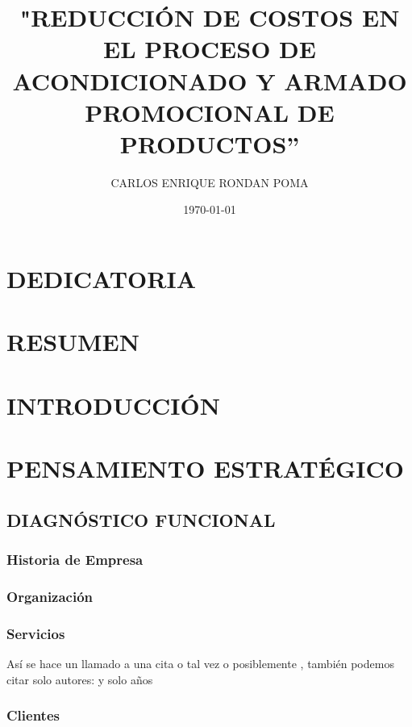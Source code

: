 \documentclass{report}
\title{"REDUCCIÓN DE COSTOS EN EL PROCESO DE ACONDICIONADO Y ARMADO PROMOCIONAL DE PRODUCTOS''}
\author{CARLOS ENRIQUE RONDAN POMA}
\date{\today}
\begin{document}


\newpage 

\fontsize{13pt}{15pt}\selectfont


\chapter*{DEDICATORIA}
\begin{flushright}
\lipsum[4]
\end{flushright}
\newpage


\tableofcontents
\newpage 

\chapter*{RESUMEN}
\lipsum[1-2]
\chapter*{INTRODUCCIÓN}
\lipsum[1-2]

\chapter{PENSAMIENTO ESTRATÉGICO}
\section{DIAGNÓSTICO FUNCIONAL}
\subsection{Historia de Empresa}
\lipsum[1-3]
\subsection{Organización}
\lipsum[5-9]
\subsection{Servicios}
\lipsum[1-3]
Así se hace un llamado a una cita  \cite{reddy2020predictive} o tal vez \citet{bansal2021performance} o posiblemente \citep{dhasaradhan2021hybrid}, también podemos citar solo autores:
\citeauthor{bansal2021performance}
y solo años \citeyear{dhasaradhan2021hybrid}
\subsection{Clientes}
\end{document}
